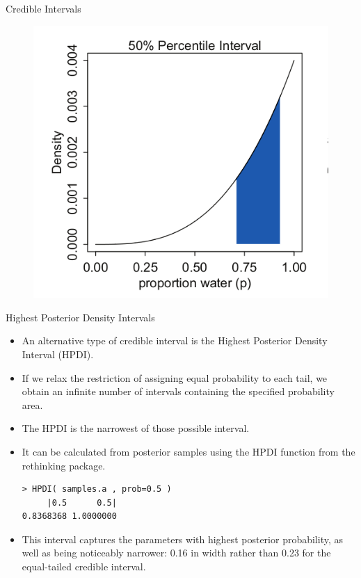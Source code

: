 \documentclass[handout]{beamer}
\begin{document}
\begin{frame}{Credible Intervals}
\scriptsize{

   \begin{figure}[h!]
	\centering
	\includegraphics[scale=0.45]{pics/interval5.png}
	\end{figure} 




} 

\end{frame}


\begin{frame}[fragile]{Highest Posterior Density Intervals}
\scriptsize{
\begin{itemize}

\item An alternative type of credible interval is the Highest Posterior Density Interval (HPDI).

\item If we relax the restriction of assigning equal probability to each tail, we obtain an infinite number of intervals containing the specified probability area.

\item The HPDI is the narrowest of those possible interval.

\item It can be calculated from posterior samples using the HPDI function from the rethinking package.

\begin{verbatim}
> HPDI( samples.a , prob=0.5 )
     |0.5      0.5| 
0.8368368 1.0000000  
\end{verbatim}

\item This interval captures the parameters with highest posterior probability, as well as being noticeably narrower: 0.16 in width rather than 0.23 for the equal-tailed credible interval.

\end{itemize}



} 

\end{frame}
\end{document}
